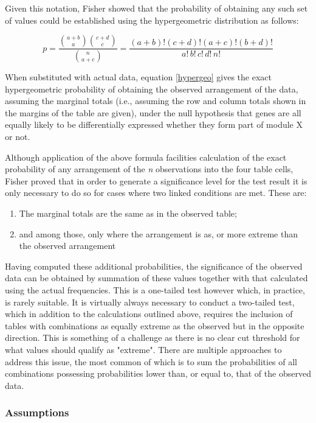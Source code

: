 Given this notation, Fisher showed that the probability of obtaining any such set of values could be established using the hypergeometric distribution as follows:

\begin{equation}
p = \frac{\binom{a+b}{a} \binom{c+d}{c}} {\binom{n}{a+c}} = \frac{(a+b)!(c+d)!(a+c)!(b+d)!}{a!\, b!\, c!\, d!\, n!} \label{hypergeo}
\end{equation}

When substituted with actual data, equation \eqref{hypergeo} gives the exact hypergeometric probability of obtaining the observed arrangement of the data, assuming the marginal totals (i.e., assuming the row and column totals shown in the margins of the table are given), under the null hypothesis that genes are all equally likely to be differentially expressed whether they form part of module X or not.  

Although application of the above formula facilities calculation of the exact probability of any arrangement of the \textit{n} observations into the four table cells, Fisher proved that in order to generate a significance level for the test result it is only necessary to do so for cases where two linked conditions are met. These are:

\begin{enumerate}
    \item  The marginal totals are the same as in the observed table;
    \item and among those, only where the arrangement is as, or more extreme than the observed arrangement
\end{enumerate}

Having computed these additional probabilities, the significance of the observed data can be obtained by summation of these values together with that calculated using the actual frequencies. This is a one-tailed test however which, in practice, is rarely suitable. It is virtually always necessary to conduct a two-tailed test, which in addition to the calculations outlined above, requires the inclusion of tables with combinations as equally extreme as the observed but in the opposite direction. This is something of a challenge as there is no clear cut threshold for what values should qualify as "extreme". There are multiple approaches to address this issue, the most common of which is to sum the probabilities of all combinations possessing probabilities lower than, or equal to, that of the observed data. 

\subsubsection{Assumptions}

